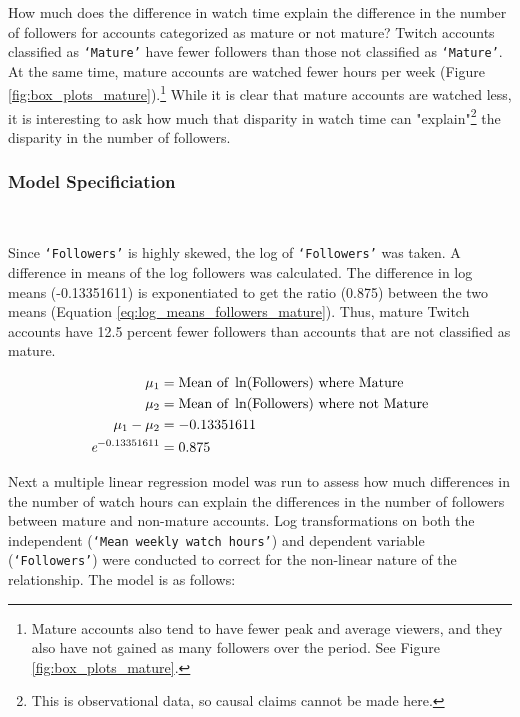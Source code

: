 \documentclass[12pt]{article}
\begin{document}
How much does the difference in watch time explain the difference in the number of followers for accounts categorized as mature or not mature? Twitch accounts classified as \texttt{`Mature'} have fewer followers than those not classified as \texttt{`Mature'}. At the same time, mature accounts are watched fewer hours per week (Figure \ref{fig:box_plots_mature}).\footnote{Mature accounts also tend to have fewer peak and average viewers, and they also have not gained as many followers over the period. See Figure \ref{fig:box_plots_mature}.} While it is clear that mature accounts are watched less, it is interesting to ask how much that disparity in watch time can "explain"\footnote{This is observational data, so causal claims cannot be made here.} the disparity in the number of followers.

\subsubsection{Model Specificiation}\

Since \texttt{`Followers'} is highly skewed, the log of \texttt{`Followers'} was taken. A difference in means of the log followers was calculated. The difference in log means (-0.13351611) is exponentiated to get the ratio (0.875) between the two means (Equation \ref{eq:log_means_followers_mature}). Thus, mature Twitch accounts have 12.5 percent fewer followers than accounts that are not classified as mature.

\begin{equation}
\begin{aligned}
\mu_{1} & = \text{Mean of } \ln(\text{Followers}) \text{ where Mature} \\
\mu_{2} & = \text{Mean of } \ln(\text{Followers}) \text{ where not Mature} \\
\mu_{1} - \mu_{2} & = -0.13351611 \\
\emph{e}^{-0.13351611} & = 0.875
\end{aligned}
\label{eq:log_means_followers_mature}
\end{equation}

Next a multiple linear regression model was run to assess how much differences in the number of watch hours can explain the differences in the number of followers between mature and non-mature accounts. Log transformations on both the independent (\texttt{`Mean weekly watch hours'}) and dependent variable (\texttt{`Followers'}) were conducted to correct for the non-linear nature of the relationship. The model is as follows:
\end{document}
